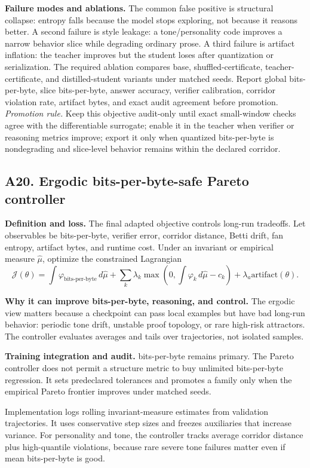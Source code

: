 \documentclass[10pt]{article}
\newcommand{\bitsperbyte}{\operatorname{bits\text{-}per\text{-}byte}}
\numberwithin{equation}{section}
\begin{document}
\noindent\textbf{Failure modes and ablations.} The common false positive is structural collapse: entropy falls because the model stops exploring, not because it reasons better. A second failure is style leakage: a tone/personality code improves a narrow behavior slice while degrading ordinary prose. A third failure is artifact inflation: the teacher improves but the student loses after quantization or serialization. The required ablation compares base, shuffled-certificate, teacher-certificate, and distilled-student variants under matched seeds. Report global bits-per-byte, slice bits-per-byte, answer accuracy, verifier calibration, corridor violation rate, artifact bytes, and exact audit agreement before promotion.
\vfill
\noindent\emph{Promotion rule.} Keep this objective audit-only until exact small-window checks agree with the differentiable surrogate; enable it in the teacher when verifier or reasoning metrics improve; export it only when quantized bits-per-byte is nondegrading and slice-level behavior remains within the declared corridor.
\clearpage
\subsection{A20. Ergodic bits-per-byte-safe Pareto controller}
\noindent\textbf{Definition and loss.} The final adapted objective controls long-run tradeoffs. Let observables be bits-per-byte, verifier error, corridor distance, Betti drift, fan entropy, artifact bytes, and runtime cost. Under an invariant or empirical measure $\widehat\mu$, optimize the constrained Lagrangian
\[
\mathcal J(\theta)=\int \varphi_{\bitsperbyte}\,d\widehat\mu+\sum_k\lambda_k\max\left(0,\int\varphi_k\,d\widehat\mu-c_k\right)+\lambda_a\mathrm{artifact}(\theta).
\]

\noindent\textbf{Why it can improve bits-per-byte, reasoning, and control.} The ergodic view matters because a checkpoint can pass local examples but have bad long-run behavior: periodic tone drift, unstable proof topology, or rare high-risk attractors. The controller evaluates averages and tails over trajectories, not isolated samples.

\noindent\textbf{Training integration and audit.} bits-per-byte remains primary. The Pareto controller does not permit a structure metric to buy unlimited bits-per-byte regression. It sets predeclared tolerances and promotes a family only when the empirical Pareto frontier improves under matched seeds.

Implementation logs rolling invariant-measure estimates from validation trajectories. It uses conservative step sizes and freezes auxiliaries that increase variance. For personality and tone, the controller tracks average corridor distance plus high-quantile violations, because rare severe tone failures matter even if mean bits-per-byte is good.
\end{document}
